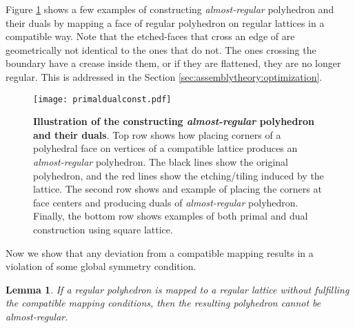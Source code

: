 \documentclass[11pt]{article}
\newtheorem{lemma}[thm]{Lemma}
\newcommand{\1}{\mathds{1}}
\begin{document}
Figure \ref{fig:assemblytheory:primaldualconst} shows a few examples of constructing \emph{almost-regular} polyhedron and their duals by mapping a face of regular polyhedron on regular lattices in a compatible way. Note that the etched-faces that cross an edge of  are geometrically not identical to the ones that do not. The ones crossing the boundary have a crease inside them, or if they are flattened, they are no longer regular. This is addressed in the Section \ref{sec:assemblytheory:optimization}.

\begin{figure}[h!]
\centering
\texttt{[image: primaldualconst.pdf]}
\caption[Illustration of the constructing \emph{almost-regular} polyhedron and their duals]{ \textbf{Illustration of the constructing \emph{almost-regular} polyhedron and their duals}. Top row shows how placing corners of a polyhedral face on vertices of a compatible lattice produces an \emph{almost-regular} polyhedron. The black lines show the original polyhedron, and the red lines show the etching/tiling induced by the lattice. The second row shows and example of placing the corners at face centers and producing duals of \emph{almost-regular} polyhedron. Finally, the bottom row shows examples of both primal and dual construction using square lattice.}
\label{fig:assemblytheory:primaldualconst}
\end{figure}


Now we show that any deviation from a compatible mapping results in a violation of some global symmetry condition.

\begin{lemma}
\label{lemma:assemblytheory:necessary1}
 If a regular polyhedron is mapped to a regular lattice without fulfilling the compatible mapping conditions, then the resulting polyhedron cannot be \emph{almost-regular}.
\end{lemma}
\end{document}
